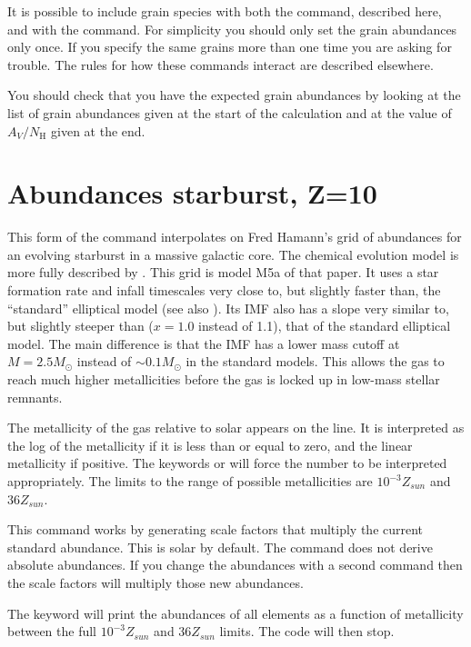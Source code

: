 It is possible to include grain species with both the
 command,
described here, and with the  command.
For simplicity you should only set the grain abundances
only once.
If you specify the same grains more than one time you are asking
for trouble.
The rules for how these commands interact are described elsewhere.

You should check that you have the expected grain abundances by looking
at the list of grain abundances given at the start of the calculation and
at the value of $A_V/N_{\mathrm{H}}$ given at the end.

\section{Abundances starburst, Z=10}

This form of the  command interpolates on
Fred Hamann's grid
of abundances for an evolving starburst in a massive galactic core.
The
chemical evolution model is more fully described by \citet{Hamann1993}.
This grid is model M5a of that paper.
It uses a star formation
rate and infall timescales very close to, but slightly faster than,
the
``standard'' elliptical model (see also \citealp{Arimoto1987,Matteucci1986,Matteucci1987,Bica1988}).
Its IMF also
has a slope very similar to, but slightly steeper than
($x = 1.0$ instead of 1.1), that of the standard elliptical model.
The main difference is
that the IMF has a lower mass cutoff at $M = 2.5 M_\odot$ instead of
$\sim 0.1 M_\odot$ in the standard models.
This allows the gas to reach much higher metallicities
before the gas is locked up in low-mass stellar remnants.

The metallicity of the gas relative to solar appears on the line.
It is interpreted as the log of the metallicity if it is
less than or equal
to zero, and the linear metallicity if positive.
The keywords
 or 
will force the number to be interpreted appropriately.
The limits to the
range of possible metallicities are $10^{-3} Z_{sun}$ and $36 Z_{sun}$.

This command works by generating scale factors that multiply
the current standard abundance.
This is solar by default.
The command does not derive
absolute abundances.
If you change the abundances with a second
command then the scale factors will multiply those new abundances.

The keyword  will print the abundances of
all elements as a function
of metallicity between the full $10^{-3} Z_{sun}$ and
$36 Z_{sun}$ limits.
The code will then stop.

